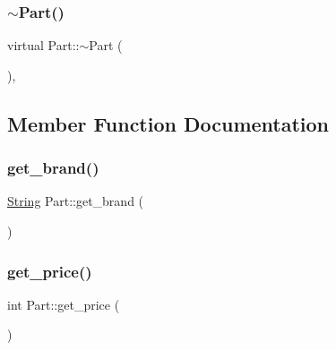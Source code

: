 \mbox{\label{class_part_aaecbb747a7227f7ce3b44caeaf1801c2}} 
\subsubsection{\texorpdfstring{$\sim$Part()}{~Part()}}
{\footnotesize\ttfamily virtual Part\+::$\sim$\+Part (\begin{DoxyParamCaption}{ }\end{DoxyParamCaption})\hspace{0.3cm}{\ttfamily [inline]}, {\ttfamily [virtual]}}



\subsection{Member Function Documentation}
\mbox{\label{class_part_abdaeb1db5ba55c184f39802c163e9ebc}} 
\subsubsection{\texorpdfstring{get\_brand()}{get\_brand()}}
{\footnotesize\ttfamily \mbox{\hyperlink{class_string}{String}} Part\+::get\+\_\+brand (\begin{DoxyParamCaption}{ }\end{DoxyParamCaption})\hspace{0.3cm}{\ttfamily [inline]}}

\mbox{\label{class_part_abb7c8371883825ad46773f219db3523e}} 
\subsubsection{\texorpdfstring{get\_price()}{get\_price()}}
{\footnotesize\ttfamily int Part\+::get\+\_\+price (\begin{DoxyParamCaption}{ }\end{DoxyParamCaption})\hspace{0.3cm}{\ttfamily [inline]}}

\mbox{\label{class_part_a97117fd470cd694ae0897fb2f4391786}} 
